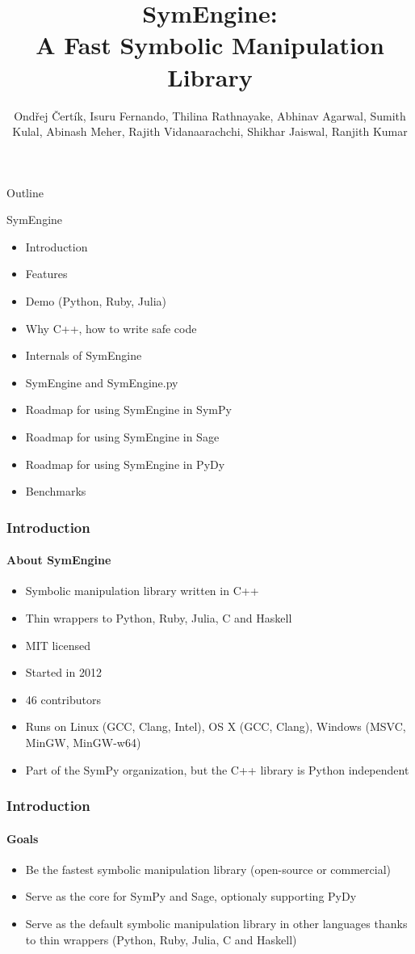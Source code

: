 \documentclass{beamer}
\title[SymEngine \hspace{14em}\insertframenumber/
\inserttotalframenumber]{SymEngine: \\A Fast Symbolic Manipulation Library}
\author[O. Čertík, I. Fernando, ...]{Ondřej Čertík, Isuru Fernando, Thilina Rathnayake, Abhinav Agarwal, Sumith Kulal, Abinash Meher, Rajith Vidanaarachchi, Shikhar Jaiswal, Ranjith Kumar}
\begin{document}
\begin{frame}
\maketitle
\end{frame}


\begin{frame}{Outline}
\begin{block}{SymEngine}
\begin{itemize}
\item Introduction
\item Features
\item Demo (Python, Ruby, Julia)
\item Why C++, how to write safe code
\item Internals of SymEngine
\item SymEngine and SymEngine.py
\item Roadmap for using SymEngine in SymPy
\item Roadmap for using SymEngine in Sage
\item Roadmap for using SymEngine in PyDy
\item Benchmarks
\end{itemize}
\end{block}
\end{frame}


\begin{frame}
\frametitle{Introduction}
\framesubtitle{About SymEngine}
\begin{itemize}
\item Symbolic manipulation library written in C++
\item Thin wrappers to Python, Ruby, Julia, C and Haskell
\item MIT licensed
\item Started in 2012
\item 46 contributors
\item Runs on Linux (GCC, Clang, Intel), OS X (GCC, Clang), Windows (MSVC,
    MinGW, MinGW-w64)
\item Part of the SymPy organization, but the C++ library is Python independent
\end{itemize}
\end{frame}


\begin{frame}
\frametitle{Introduction}
\framesubtitle{Goals}
\begin{itemize}
\item Be the fastest symbolic manipulation library (open-source or commercial)
\item Serve as the core for SymPy and Sage, optionaly supporting PyDy
\item Serve as the default symbolic manipulation library in other languages
    thanks to thin wrappers (Python, Ruby, Julia, C and Haskell)
\end{itemize}
\end{frame}
\end{document}
